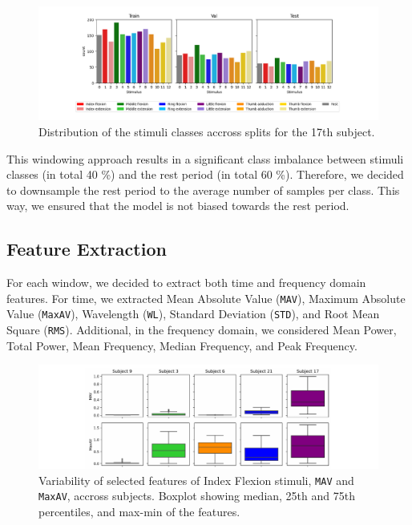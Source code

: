 \documentclass[10pt]{article}
\begin{document}
\begin{figure}[h]
    \centering
    \includegraphics[width=1\textwidth]{../figures/downsampling.pdf}
    \caption{Distribution of the stimuli classes accross splits for the 17th subject.}
    \label{fig:downsampling}
\end{figure}

This windowing approach results in a significant class imbalance between stimuli classes (in total 40 \%) and the rest period (in total 60 \%).
Therefore, we decided to downsample the rest period to the average number of samples per class. This way, we ensured that the model is not biased towards the rest period.

\subsection{Feature Extraction}
For each window, we decided to extract both time and frequency domain features. For time, we extracted 
Mean Absolute Value (\texttt{MAV}), Maximum Absolute Value (\texttt{MaxAV}), Wavelength (\texttt{WL}), Standard Deviation (\texttt{STD}), and Root Mean Square (\texttt{RMS}). 
Additional, in the frequency domain, we considered Mean Power, Total Power, Mean Frequency, Median Frequency, and Peak Frequency. 

\begin{figure}[h]
    \centering
    \includegraphics[width=1\textwidth]{../figures/inter_sub_var.pdf}
    \caption{Variability of selected features of Index Flexion stimuli, \texttt{MAV} and \texttt{MaxAV}, accross subjects. Boxplot showing median, 25th and 75th percentiles, and max-min of the features.}
    \label{fig:feat_var}
\end{figure}
\end{document}
